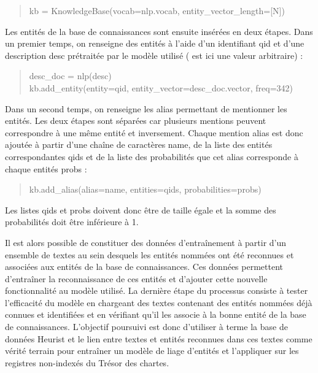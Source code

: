 \documentclass[a4paper,12pt,twoside]{book}
\begin{document}
	\begin{quotation}
		kb = KnowledgeBase(vocab=nlp.vocab, entity\_vector\_length=[N])
	\end{quotation}
	
	Les entités de la base de connaissances sont ensuite insérées en deux étapes. Dans un premier temps, on renseigne des entités à l'aide d'un identifiant \og qid\fg{} et d'une description \og desc\fg{} prétraitée par le modèle utilisé (\fg{} est ici une valeur arbitraire) :
	
	\begin{quotation}
			desc\_doc = nlp(desc)\\
			\indent kb.add\_entity(entity=qid, entity\_vector=desc\_doc.vector, freq=342)
	\end{quotation}
	
	Dans un second temps, on renseigne les alias permettant de mentionner les entités. Les deux étapes sont séparées car plusieurs mentions peuvent correspondre à une même entité et inversement. Chaque mention \og alias\fg{} est donc ajoutée à partir d'une chaîne de caractères \og name\fg{}, de la liste des entités correspondantes \og qids\fg{} et de la liste des probabilités que cet alias corresponde à chaque entités \og probs\fg{} :
	
	\begin{quotation}
		kb.add\_alias(alias=name, entities=qids, probabilities=probs)
	\end{quotation}
	
	\noindent Les listes \og qids\fg{} et \og probs\fg{} doivent donc être de taille égale et la somme des probabilités doit être inférieure à 1.
	
	Il est alors possible de constituer des données d'entraînement à partir d'un ensemble de textes au sein desquels les entités nommées ont été reconnues et associées aux entités de la base de connaissances. Ces données permettent d'entraîner la reconnaissance de ces entités et d'ajouter cette nouvelle fonctionnalité au modèle utilisé. La dernière étape du processus consiste à tester l'efficacité du modèle en chargeant des textes contenant des entités nommées déjà connues et identifiées et en vérifiant qu'il les associe à la bonne entité de la base de connaissances. L'objectif poursuivi est donc d'utiliser à terme la base de données Heurist et le lien entre textes et entités reconnues dans ces textes comme vérité terrain pour entraîner un modèle de liage d'entités et l'appliquer sur les registres non-indexés du Trésor des chartes.
	
\end{document}

